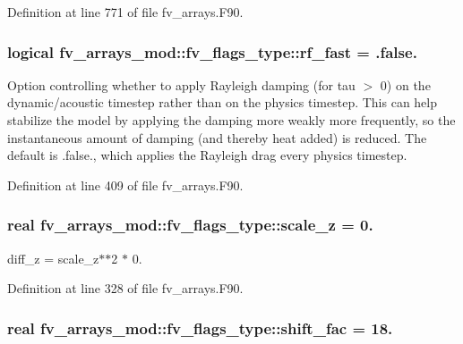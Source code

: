 Definition at line 771 of file fv\-\_\-arrays.\-F90.

\subsubsection[{rf\-\_\-fast}]{\setlength{\rightskip}{0pt plus 5cm}logical fv\-\_\-arrays\-\_\-mod\-::fv\-\_\-flags\-\_\-type\-::rf\-\_\-fast = .false.}\label{structfv__arrays__mod_1_1fv__flags__type_a1c474ace44c4f507b091496eabf667bd}


Option controlling whether to apply Rayleigh damping (for tau $>$ 0) on the dynamic/acoustic timestep rather than on the physics timestep. This can help stabilize the model by applying the damping more weakly more frequently, so the instantaneous amount of damping (and thereby heat added) is reduced. The default is .false., which applies the Rayleigh drag every physics timestep. 



Definition at line 409 of file fv\-\_\-arrays.\-F90.

\subsubsection[{scale\-\_\-z}]{\setlength{\rightskip}{0pt plus 5cm}real fv\-\_\-arrays\-\_\-mod\-::fv\-\_\-flags\-\_\-type\-::scale\-\_\-z = 0.}\label{structfv__arrays__mod_1_1fv__flags__type_a3181a20aaac99c0817af03924d71b0fd}


diff\-\_\-z = scale\-\_\-z$\ast$$\ast$2 $\ast$ 0. 



Definition at line 328 of file fv\-\_\-arrays.\-F90.

\subsubsection[{shift\-\_\-fac}]{\setlength{\rightskip}{0pt plus 5cm}real fv\-\_\-arrays\-\_\-mod\-::fv\-\_\-flags\-\_\-type\-::shift\-\_\-fac = 18.}\label{structfv__arrays__mod_1_1fv__flags__type_ae661493f3d099801d7487cfae6902c89}


